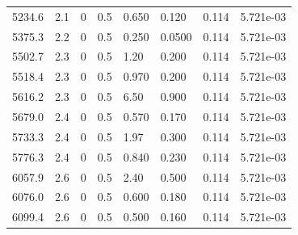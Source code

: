 \documentclass[preview]{standalone}
\begin{document}
{{{\begin{tabular}{L{1.2cm}C{1.2cm} C{0.3cm}C{0.5cm} C{1.4cm}C{1.4cm} C{1.4cm}C{1.4cm}}
  5234.6  &   2.1  & 0     & 0.5 &  0.650  & 0.120  & 0.114 &  5.721e-03   \\ 
  5375.3  &   2.2  & 0     & 0.5 &  0.250  & 0.0500  & 0.114 &  5.721e-03   \\ 
  5502.7  &   2.3  & 0     & 0.5 &  1.20  & 0.200  & 0.114 &  5.721e-03   \\ 
  5518.4  &   2.3  & 0     & 0.5 &  0.970  & 0.200  & 0.114 &  5.721e-03   \\ 
  5616.2  &   2.3  & 0     & 0.5 &  6.50  & 0.900  & 0.114 &  5.721e-03   \\ 
  5679.0  &   2.4  & 0     & 0.5 &  0.570  & 0.170  & 0.114 &  5.721e-03   \\ 
  5733.3  &   2.4  & 0     & 0.5 &  1.97  & 0.300  & 0.114 &  5.721e-03   \\ 
  5776.3  &   2.4  & 0     & 0.5 &  0.840  & 0.230  & 0.114 &  5.721e-03   \\ 
  6057.9  &   2.6  & 0     & 0.5 &  2.40  & 0.500  & 0.114 &  5.721e-03   \\ 
  6076.0  &   2.6  & 0     & 0.5 &  0.600  & 0.180  & 0.114 &  5.721e-03   \\ 
  6099.4  &   2.6  & 0     & 0.5 &  0.500  & 0.160  & 0.114 &  5.721e-03   \\ 
\hline 
\end{tabular} 

}}}
\end{document}
